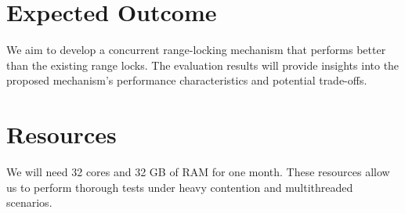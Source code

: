\section{Expected Outcome}
We aim to develop a concurrent range-locking mechanism that performs better than the existing range locks. The evaluation results will provide insights into the proposed mechanism's performance characteristics and potential trade-offs.

\section{Resources}
We will need 32 cores and 32 GB of RAM for one month. These resources allow us to perform thorough tests under heavy contention and multithreaded scenarios.